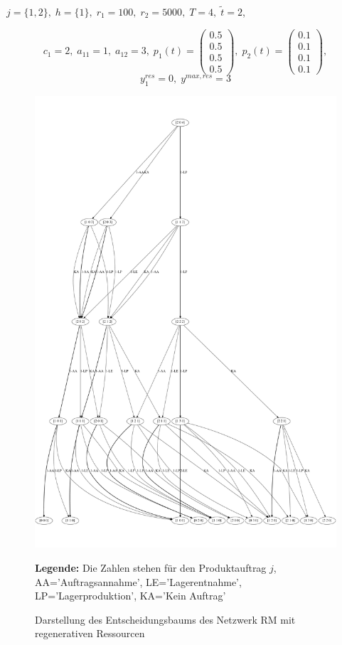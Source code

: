\begin{center}
$j = \{1, 2\}, \; h = \{1\}, \; r_{1} = 100, \; r_{2} = 5000, \; T=4, \; \tilde{t}=2 $,
\end{center}
\[
    c_{1}=2, \;
    a_{11}=1, \;
     a_{12}=3, \;
     p_{1}(t)=\begin{pmatrix} 0.5\\ 0.5\\ 0.5\\ 0.5  \end{pmatrix}, \;
     p_{2}(t)=\begin{pmatrix} 0.1\\ 0.1\\ 0.1\\ 0.1  \end{pmatrix},
  \]
  \[
    y_{1}^{res}= 0, \;
    y^{max,res}=3
      \]
\begin{figure}[h!]
  \begin{center}
    \includegraphics[width=150mm]{Bilder/Beispiel6.pdf}
    \caption{Darstellung des Entscheidungsbaums des Netzwerk RM mit regenerativen Ressourcen}  \label{B6}
    {\footnotesize \textbf{Legende:} Die Zahlen stehen für den Produktauftrag $j$, AA='Auftragsannahme', LE='Lagerentnahme', LP='Lagerproduktion', KA='Kein Auftrag'} 
  \end{center}
\end{figure}

